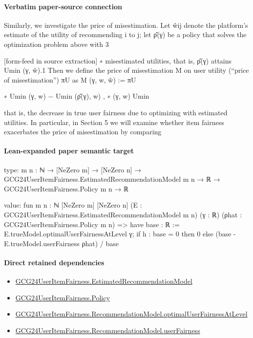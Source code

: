 \documentclass[10pt]{article}
\begin{document}
\paragraph{Verbatim paper-source connection}
\begin{ReviewVerbatim}
Similarly, we investigate the price of misestimation. Let ŵij denote the platform’s estimate of the
utility of recommending i to j; let ρ̂(γ) be a policy that solves the optimization problem above with
3


[form-feed in source extraction]
∗
misestimated utilities, that is, ρ̂(γ) attains Umin
(γ, ŵ).1 Then we define the price of misestimation
M
on user utility (“price of misestimation”) πU as
M
(γ, w, ŵ) :=
πU

∗
Umin
(γ, w) − Umin (ρ̂(γ), w)
,
∗ (γ, w)
Umin

that is, the decrease in true user fairness due to optimizing with estimated utilities. In particular, in
Section 5 we will examine whether item fairness exacerbates the price of misestimation by comparing
\end{ReviewVerbatim}



\paragraph{Lean-expanded paper semantic target}
\begin{ReviewVerbatim}
type:
{m n : ℕ} →
  [NeZero m] →
    [NeZero n] → GCG24UserItemFairness.EstimatedRecommendationModel m n → ℝ → GCG24UserItemFairness.Policy m n → ℝ

value:
fun {m n : ℕ} [NeZero m] [NeZero n] (E : GCG24UserItemFairness.EstimatedRecommendationModel m n) (γ : ℝ)
    (ρhat : GCG24UserItemFairness.Policy m n) =>
  have base : ℝ := E.trueModel.optimalUserFairnessAtLevel γ;
  if h : base = 0 then 0 else (base - E.trueModel.userFairness ρhat) / base
\end{ReviewVerbatim}

\paragraph{Direct retained dependencies}
\begin{itemize}\raggedright
\item \hyperlink{governing-declaration-aee7fe9d79b0958e}{GCG24\allowbreak{}User\allowbreak{}Item\allowbreak{}Fairness.\allowbreak{}Estimated\allowbreak{}Recommendation\allowbreak{}Model}
\item \hyperlink{governing-declaration-34ca6b905b48428a}{GCG24\allowbreak{}User\allowbreak{}Item\allowbreak{}Fairness.\allowbreak{}Policy}
\item \hyperlink{governing-declaration-6b09a099b968863c}{GCG24\allowbreak{}User\allowbreak{}Item\allowbreak{}Fairness.\allowbreak{}Recommendation\allowbreak{}Model.\allowbreak{}optimal\allowbreak{}User\allowbreak{}Fairness\allowbreak{}At\allowbreak{}Level}
\item \hyperlink{paper-prerequisite-e6f0823c4d783c83}{GCG24\allowbreak{}User\allowbreak{}Item\allowbreak{}Fairness.\allowbreak{}Recommendation\allowbreak{}Model.\allowbreak{}user\allowbreak{}Fairness}
\end{itemize}
\end{document}
